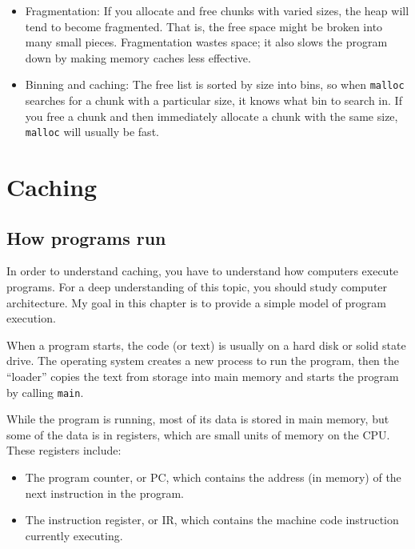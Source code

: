 \documentclass[12pt]{book}
\begin{document}
{\begin{itemize}
\item Fragmentation: If you allocate and free chunks with varied
  sizes, the heap will tend to become fragmented.  That is, the free
  space might be broken into many small pieces.  Fragmentation wastes
  space; it also slows the program down by making memory caches less
  effective.

\item Binning and caching: The free list is sorted by size into bins,
  so when {\tt malloc} searches for a chunk with a particular size, it
  knows what bin to search in.  If you free a chunk and then
  immediately allocate a chunk with the same size, {\tt malloc} will
  usually be fast.

\end{itemize}


\chapter{Caching}


\section{How programs run}

In order to understand caching, you have to understand how computers
execute programs.  For a deep understanding of this topic, you should
study computer architecture.  My goal in this chapter is to provide
a simple model of program execution.

When a program starts, the code (or text) is usually on a hard disk
or solid state drive.  The operating system creates a new process to
run the program, then the ``loader''
copies the text from storage into main memory and starts the program by
calling {\tt main}.

While the program is running, most of its data is stored in main
memory, but some of the data is in registers, which are
small units of memory on the CPU.  These registers include:

\begin{itemize}

\item The program counter, or PC, which contains the address (in
  memory) of the next instruction in the program.

\item The instruction register, or IR, which contains the machine code
  instruction currently executing.


\end{itemize}}
\end{document}
